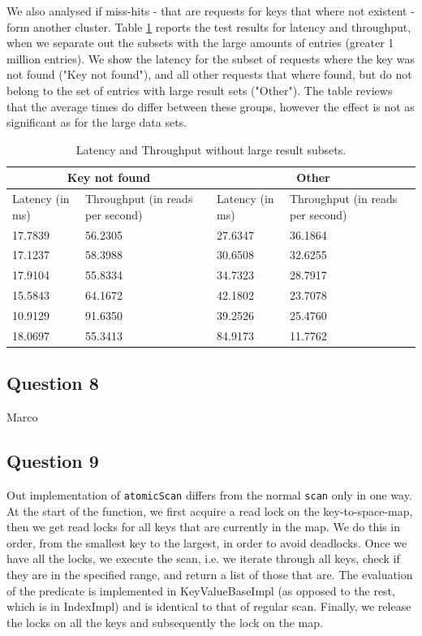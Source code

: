 \documentclass[12pt,a4paper]{article}
\begin{document}
We also analysed if miss-hits - that are requests for keys that where not existent - form another cluster. Table \ref{tab:other} reports the test results for latency and throughput, when we separate out the subsets with the large amounts of entries (greater 1 million entries). We show the latency for  the subset of requests where the key was not found ("Key not found"), and all other requests that where found, but do not belong to the set of entries with large result sets ("Other"). The table reviews that the average times do differ between these groups, however the effect is not as significant as for the large data sets.

\begin{table}
\caption{Latency and Throughput without large result subsets.}
\centering
\begin{tabular}{|p{}|p{}|p{}|p{}|}
\hline
\multicolumn{2}{|c|}{Key not found} & \multicolumn{2}{|c|}{Other} \\ \hline
Latency (in ms) & Throughput (in reads per second) & Latency (in ms) & Throughput (in reads per second) \\ \hline
17.7839 & 56.2305 & 27.6347 & 36.1864 \\ \hline
17.1237 & 58.3988 & 30.6508 & 32.6255 \\ \hline
17.9104 & 55.8334 & 34.7323 & 28.7917 \\ \hline
15.5843 & 64.1672 & 42.1802 & 23.7078 \\ \hline
10.9129 & 91.6350 & 39.2526 & 25.4760 \\ \hline
18.0697 & 55.3413 & 84.9173 & 11.7762 \\ \hline
\end{tabular}
\label{tab:other}
\end{table}

\subsection*{Question 8}
\label{sec:pq8}
Marco

\subsection*{Question 9}
\label{sec:pq9}
Out implementation of \texttt{atomicScan} differs from the normal \texttt{scan} only in one way. At the start of the function, we first acquire a read lock on the key-to-space-map, then we get read locks for all keys that are currently in the map. We do this in order, from the smallest key to the largest, in order to avoid deadlocks. Once we have all the locks, we execute the scan, i.e. we iterate through all keys, check if they are in the specified range, and return a list of those that are. The evaluation of the predicate is implemented in KeyValueBaseImpl (as opposed to the rest, which is in IndexImpl) and is identical to that of regular scan. Finally, we release the locks on all the keys and subsequently the lock on the map.
\end{document}
